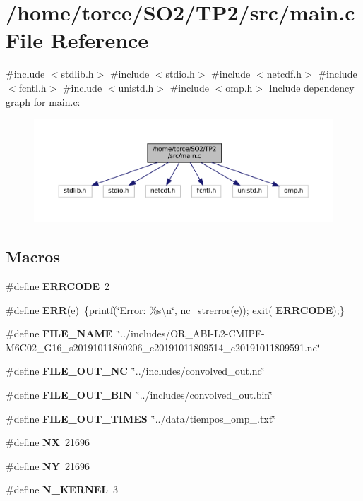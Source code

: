 \section{/home/torce/\+S\+O2/\+T\+P2/src/main.c File Reference}
\label{main_8c}
{\ttfamily \#include $<$stdlib.\+h$>$}\newline
{\ttfamily \#include $<$stdio.\+h$>$}\newline
{\ttfamily \#include $<$netcdf.\+h$>$}\newline
{\ttfamily \#include $<$fcntl.\+h$>$}\newline
{\ttfamily \#include $<$unistd.\+h$>$}\newline
{\ttfamily \#include $<$omp.\+h$>$}\newline
Include dependency graph for main.\+c\+:
\nopagebreak
\begin{figure}[H]
\begin{center}
\leavevmode
\includegraphics[width=350pt]{main_8c__incl}
\end{center}
\end{figure}
\subsection*{Macros}
\begin{DoxyCompactItemize}
\item 
\#define \textbf{ E\+R\+R\+C\+O\+DE}~2
\item 
\#define \textbf{ E\+RR}(e)~\{printf(\char`\"{}Error\+: \%s\textbackslash{}n\char`\"{}, nc\+\_\+strerror(e)); exit(\textbf{ E\+R\+R\+C\+O\+DE});\}
\item 
\#define \textbf{ F\+I\+L\+E\+\_\+\+N\+A\+ME}~\char`\"{}../includes/O\+R\+\_\+\+A\+BI-\/L2-\/C\+M\+I\+PF-\/M6\+C02\+\_\+\+G16\+\_\+s20191011800206\+\_\+e20191011809514\+\_\+c20191011809591.\+nc\char`\"{}
\item 
\#define \textbf{ F\+I\+L\+E\+\_\+\+O\+U\+T\+\_\+\+NC}~\char`\"{}../includes/convolved\+\_\+out.\+nc\char`\"{}
\item 
\#define \textbf{ F\+I\+L\+E\+\_\+\+O\+U\+T\+\_\+\+B\+IN}~\char`\"{}../includes/convolved\+\_\+out.\+bin\char`\"{}
\item 
\#define \textbf{ F\+I\+L\+E\+\_\+\+O\+U\+T\+\_\+\+T\+I\+M\+ES}~\char`\"{}../data/tiempos\+\_\+omp\+\_.\+txt\char`\"{}
\item 
\#define \textbf{ NX}~21696
\item 
\#define \textbf{ NY}~21696
\item 
\#define \textbf{ N\+\_\+\+K\+E\+R\+N\+EL}~3
\end{DoxyCompactItemize}
